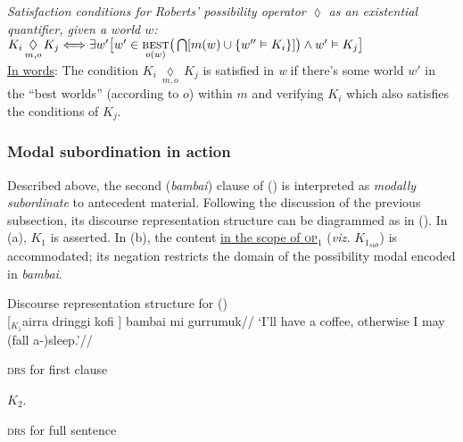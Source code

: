 \ex{}\emph{Satisfaction conditions for Roberts' possibility operator $ \lozenge $ as an existential quantifier, given a world $ w $:\\} 
$K_i\,\underset{m,o}{\lozenge}\,K_j \Longleftrightarrow\exists w'\big[w'\in\underset{o(w)}{\textsc{best}}\big(\bigcap[m(w)\cup\{w''\vDash K_i\}]\big) \wedge w'\vDash K_j\big]$\\[6pt]
\underline{In words}: The condition $K_i\,\underset{m,o}{\lozenge}\,K_j$ is satisfied in \textit{w} if there's some world $ w' $ in the ``best worlds'' (according to $ o $) within $ m $ and verifying $ K_i $ which also satisfies the conditions of $ K_j $.\xe

\subsubsection{Modal subordination in action}

Described above, the second (\textit{bambai}) clause of () is interpreted as \textit{modally subordinate} to antecedent material. Following the discussion of the previous subsection, its discourse representation structure can be diagrammed as in (\nextx). In (a), $ K_1 $ is asserted. In (b), the content \ul{in the scope of \textsc{op}$ _1 $} (\textit{viz.} $ \mathit{K_{1_{\text{sub}}}} $) is accommodated; its negation restricts the domain of the possibility modal encoded in \textit{bambai}.

\pex[labeltype=numeric,labelformat=$\mathit K_A.$]{} Discourse representation structure for ()\\
\begingl\gla{} \textup{[$ _\mathit{K_1} $}airra dringgi kofi \textup{]} bambai mi gurrumuk//
\glft`I'll have a coffee, otherwise I may (fall a-)sleep.'//\endgl{}\\
\a \begin{minipage}[t]{.3\textwidth}\textsc{drs} for first clause\\


\end{minipage}$ \mathit{K_2} $.\quad\begin{minipage}[t]{.3\textwidth}\textsc{drs} for full sentence\\
	 	
	 \end{minipage}


